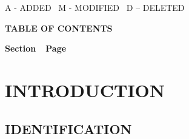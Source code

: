 \documentclass[twoside,letterpaper]{article}
\begin{document}
{\color{black}
A - ADDED \ M - MODIFIED \ D -- DELETED}


{\centering{}\bfseries\color{black}
TABLE OF CONTENTS
\par}

{\bfseries\color{black}
Section\ \ Page}

\setcounter{tocdepth}{9}
\renewcommand\contentsname{}
\tableofcontents

\bigskip

\bigskip



\clearpage\setcounter{page}{1}\pagestyle{Convertiv}
\section[INTRODUCTION]{\bfseries\color{black}
INTRODUCTION}

\subsection{IDENTIFICATION}
\end{document}
